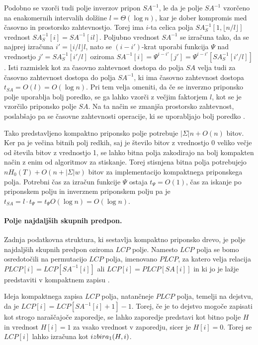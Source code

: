 Podobno se vzorči tudi polje inverzov pripon $SA^{-1}$, le da je polje $SA^{-1}$ vzorčeno na enakomernih intervalih dolžine $l=\Theta(\log{n})$, kar je dober kompromis med časovno in prostorsko zahtevnostjo. Torej ima $i$-ta celica polja $SA^{-1}_S[1,\lfloor n/l\rfloor]$ vrednost $SA^{-1}_S[i]=SA^{-1}[il]$. Poljubno vrednost $SA^{-1}$ se izračuna tako, da se najprej izračuna $i'=\lfloor i/l\rfloor l$, nato se $(i-i')$-krat uporabi funkcija $\Psi$ nad vrednostjo $j'=SA^{-1}_S[i'/l]$ oziroma $SA^{-1}[i]=\Psi^{i-i'}[j']=\Psi^{i-i'}[SA^{-1}_S[i'/l]]$. Isti razmislek kot za časovno zahtevnost dostopa do polja $SA$ velja tudi za časovno zahtevnost dostopa do polja $SA^{-1}$, ki ima časovno zahtevnost dostopa $t_{SA}=O(l)=O(\log{n})$. Pri tem velja omeniti, da če se inverzno priponsko polje uporablja bolj poredko, se ga lahko vzorči z večjim faktorjem $l$, kot se je vzorčilo priponsko polje $SA$. Na ta način se zmanjša prostorsko zahtevnost, poslabšajo pa se časovne zahtevnosti operacije, ki se uporabljajo bolj poredko \cite{Navarro2016}.

Tako predstavljeno kompaktno priponsko polje potrebuje $|\Sigma|n + O(n)$ bitov. Ker pa je večina bitnih polj redkih, saj je število bitov z vrednostjo 0 veliko večje od števila bitov z vrednostjo 1, se lahko bitna polja zakodirajo na bolj kompakten način z enim od algoritmov za stiskanje. Torej stisnjena bitna polja potrebujejo $nH_0(T)+O(n+|\Sigma|w)$ bitov za implementacijo kompaktnega priponskega polja. Potrebni čas za izračun funkcije $\Psi$ ostaja $t_\Psi=O(1)$, čas za iskanje po priponskem polju in inverznem priponskem polju pa je $t_{SA}=l\cdot t_\Psi = t_\Psi O(\log{n}) = O(\log{n})$.


\paragraph{Polje najdaljših skupnih predpon.}
Zadnja podatkovna struktura, ki sestavlja kompaktno priponsko drevo, je polje najdaljših skupnih predpon oziroma $LCP$ polje. Namesto $LCP$ polja se bomo osredotočili na permutacijo $LCP$ polja, imenovano $PLCP$, za katero velja relacija $PLCP[i]=LCP[SA^{-1}[i]]$ ali $LCP[i]=PLCP[SA[i]]$ in ki jo je lažje predstaviti v kompaktnem zapisu \cite{Navarro2016, Sadakane2007}.

Ideja kompaktnega zapisa $LCP$ polja, natančneje $PLCP$ polja, temelji na dejstvu, da je $LCP[i]=LCP[SA^{-1}[i]+1]-1$. Torej, če je to dejstvo mogoče zapisati kot strogo naraščajoče zaporedje, se lahko zaporedje predstavi kot bitno polje $H$ in vrednost $H[i]=1$ za vsako vrednost v zaporedju, sicer je $H[i]=0$. Torej se $LCP[i]$ lahko izračuna kot $ \mathop{izbira}\nolimits_{1}(H,i)$.

